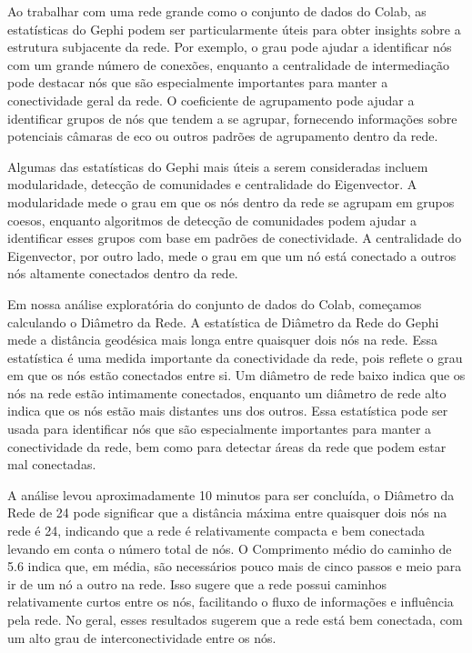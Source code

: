 Ao trabalhar com uma rede grande como o conjunto de dados do Colab, as estatísticas do Gephi podem ser particularmente úteis para obter insights sobre a estrutura subjacente da rede. Por exemplo, o grau pode ajudar a identificar nós com um grande número de conexões, enquanto a centralidade de intermediação pode destacar nós que são especialmente importantes para manter a conectividade geral da rede. O coeficiente de agrupamento pode ajudar a identificar grupos de nós que tendem a se agrupar, fornecendo informações sobre potenciais câmaras de eco ou outros padrões de agrupamento dentro da rede.

Algumas das estatísticas do Gephi mais úteis a serem consideradas incluem modularidade, detecção de comunidades e centralidade do Eigenvector. A modularidade mede o grau em que os nós dentro da rede se agrupam em grupos coesos, enquanto algoritmos de detecção de comunidades podem ajudar a identificar esses grupos com base em padrões de conectividade. A centralidade do Eigenvector, por outro lado, mede o grau em que um nó está conectado a outros nós altamente conectados dentro da rede.

Em nossa análise exploratória do conjunto de dados do Colab, começamos calculando o Diâmetro da Rede. A estatística de Diâmetro da Rede do Gephi mede a distância geodésica mais longa entre quaisquer dois nós na rede. Essa estatística é uma medida importante da conectividade da rede, pois reflete o grau em que os nós estão conectados entre si. Um diâmetro de rede baixo indica que os nós na rede estão intimamente conectados, enquanto um diâmetro de rede alto indica que os nós estão mais distantes uns dos outros. Essa estatística pode ser usada para identificar nós que são especialmente importantes para manter a conectividade da rede, bem como para detectar áreas da rede que podem estar mal conectadas.

A análise levou aproximadamente 10 minutos para ser concluída, o Diâmetro da Rede de 24 pode significar que a distância máxima entre quaisquer dois nós na rede é 24, indicando que a rede é relativamente compacta e bem conectada levando em conta o número total de nós. O Comprimento médio do caminho de 5.6 indica que, em média, são necessários pouco mais de cinco passos e meio para ir de um nó a outro na rede. Isso sugere que a rede possui caminhos relativamente curtos entre os nós, facilitando o fluxo de informações e influência pela rede. No geral, esses resultados sugerem que a rede está bem conectada, com um alto grau de interconectividade entre os nós.

